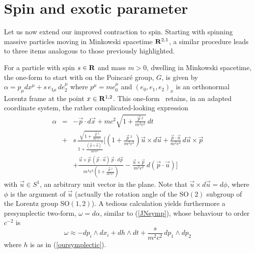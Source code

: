 \documentclass[a4paper,11pt]{article}
\let\ssection=\section
\renewcommand{\section}{\setcounter{equation}{0}\ssection}
\newcommand{\bR}{{\bf R}}
\newcommand{\vx}{{\vec x}}
\def\vp{{\vec p}}
\def\vx{{\vec x}}
\def\vu{{\vec u}}
\begin{document}
\section{Spin and exotic parameter}

Let us now extend our improved contraction to spin.
Starting with spinning massive particles
moving in Minkowski spacetime $\bR^{2,1}$, a similar procedure leads
to three items analogous to those previously highlighted.


  For a particle with
spin $s\in\bR$ and mass $m>0$, dwelling in Minkowski spacetime,
the one-form to start with on the Poincar\'e group, $G$, is given \cite{SSD} by
$
\alpha=p_\mu{}dx^\mu+s\,e_{1\mu}\,de_2^\mu
$
where $p^\mu=m{}e_0^\mu$ and $(e_0,e_1,e_2)_x$ is an orthonormal Lorentz
frame at the point $x\in\bR^{1,2}$. This one-form~
retains, in an adapted coordinate system, the rather complicated-looking
expression
\begin{equation}
\begin{array}{rcl}
\alpha
&=&
\displaystyle
-\vp\cdot{}d\vx+mc^2\sqrt{1+\frac{\vp{\,}^2}{m^2c^2}}\,dt
\\[12pt]
&+&s\,
\displaystyle
\frac{\sqrt{1+\displaystyle\frac{\vp{\,}^2}{m^2c^2}}}
{1+\displaystyle\frac{(\vp\times\vu)^2}{m^2c^2}}
\Bigg[
\left(1+\displaystyle\frac{\vp{\,}^2}{m^2c^2}\right)\vu\times{}d\vu
+
\displaystyle\frac{\vp\cdot\vu}{m^2c^2}\,d\vu\times\vp
\\[20pt]
&&
+\displaystyle\frac{\vu\times\vp\,(\vp\cdot\vu)\,\vp\cdot{}d\vp}
{m^4c^4\left(1+\displaystyle\frac{\vp{\,}^2}{m^2c^2}\right)}
-
\displaystyle\frac{\vu\times\vp}{m^2c^2}\,d(\vp\cdot\vu)
\Bigg]
\label{alphaSpinPoincare}
\end{array}
\end{equation}
with $\vu\in{}S^1$, an arbitrary unit vector in the plane.
Note that $\vu\times{}d\vu=d\phi$, where $\phi$ is
the argument of $\vu$ (actually
   the rotation angle of the $\mathrm{SO}(2)$ subgroup of the Lorentz
group $\mathrm{SO}(1,2)$).
A tedious calculation yields furthermore a presymplectic two-form,
$\omega=d\alpha$, similar to (\ref{JNsymp}),
whose behaviour to order $c^{-2}$ is
\begin{equation}
\omega
\approx
-dp_i\wedge{}dx_i
+
dh\wedge{}dt
+
\frac{s}{m^2c^2}\,dp_1\wedge{}dp_2
\label{sigmaBis}
\end{equation}
where $h$ is as in (\ref{oursymplectic}).
\end{document}
